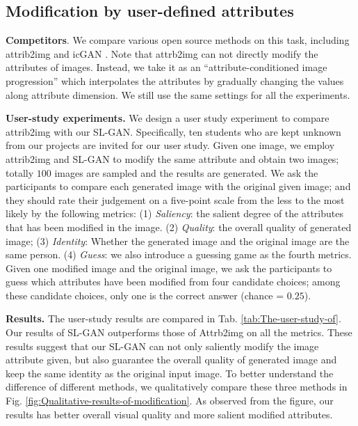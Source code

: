 \documentclass[10pt,letterpaper,twocolumn]{article}
\begin{document}
\subsection{Modification by user-defined attributes}


\noindent \textbf{Competitors}. We compare various open source methods
on this task, including attrib2img \cite{yan2016eccv} and icGAN \cite{Guim2016nipsworkshop}.
Note that attrb2img can not directly modify the attributes of images.
Instead, we take it as an ``attribute-conditioned image progression''
which interpolates the attributes by gradually changing the values
along attribute dimension. We still use the same settings for all
the experiments.

\noindent \textbf{User-study experiments.} We design a user study
experiment to compare attrib2img with our SL-GAN. Specifically, ten
students who are kept unknown from our projects are invited for our
user study. Given one image, we employ attrib2img and SL-GAN to modify
the same attribute and obtain two images; totally $100$ images are
sampled and the results are generated. We ask the participants to
compare each generated image with the original given image; and they
should rate their judgement on a five-point scale from the less to
the most likely by the following metrics: (1) \emph{Saliency}: the
salient degree of the attributes that has been modified in the image.
(2) \emph{Quality}: the overall quality of generated image; (3) \emph{Identity}:
Whether the generated image and the original image are the same person.
(4) \emph{Guess}: we also introduce a guessing game as the fourth
metrics. Given one modified image and the original image, we ask the
participants to guess which attributes have been modified from four
candidate choices; among these candidate choices, only one is the
correct answer (chance = $0.25$).

\noindent \textbf{Results.} The user-study results are compared in
Tab. \ref{tab:The-user-study-of}. Our results of SL-GAN outperforms
those of Attrb2img on all the metrics. These results suggest that
our SL-GAN can not only saliently modify the image attribute given,
but also guarantee the overall quality of generated image and keep
the same identity as the original input image. To better understand
the difference of different methods, we qualitatively compare these
three methods in Fig. \ref{fig:Qualitative-results-of-modification}.
As observed from the figure, our results has better overall visual
quality and more salient modified attributes.
\end{document}
